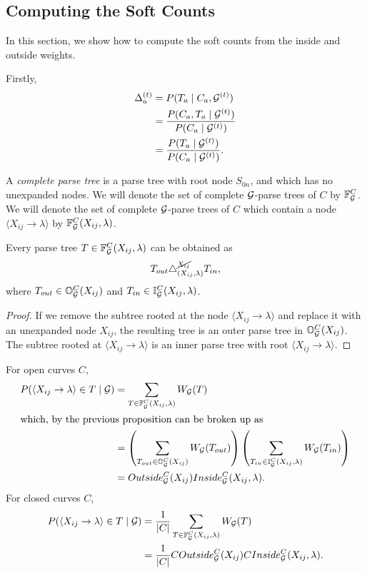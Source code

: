 \documentclass{article}
\newcommand\Inner{\mathbb{I}}
\newcommand\Outer{\mathbb{O}}
\begin{document}
\subsection{Computing the Soft Counts}
In this section, we show how to compute the soft counts from the inside and outside weights.

Firstly,
\begin{align*}
\Delta_a^{(t)} &= P(T_a \mid C_a, {\mathcal G}^{(t)})\\
 &= \frac{P(C_a, T_a \mid {\mathcal G}^{(t)})}{P(C_a \mid {\mathcal G}^{(t)})}\\
&= \frac{P(T_a \mid {\mathcal G}^{(t)})}{P(C_a \mid {\mathcal G}^{(t)})}.\\
\end{align*}

\begin{defn}
A {\em complete parse tree} is a parse tree with root node $S_{0n}$,
and which has no unexpanded nodes. We will denote the set of complete
${\mathcal G}$-parse trees of $C$ by $\mathbb{F}_{{\mathcal G}}^C$. We will denote the set of
complete ${\mathcal G}$-parse trees of $C$ which contain a node $\langle
X_{ij}\to \lambda \rangle$ by $\mathbb{F}_{{\mathcal G}}^C(X_{ij}, \lambda)$.
\end{defn}

\begin{prop}
Every parse tree $T \in \mathbb{F}_{{\mathcal G}}^C(X_{ij}, \lambda)$ can be obtained as
$$T_{out} \triangle^{\cancel{X_{ij}}}_{(X_{ij},\lambda)} T_{in},$$ 
where $T_{out}\in \Outer_\GGG^C(X_{ij})$ and $T_{in} \in
\Inner_\GGG^C(X_{ij}, \lambda)$.
\end{prop}
\begin{proof}
If we remove the subtree rooted at the node $\langle X_{ij} \to
\lambda \rangle$ and replace it with an unexpanded node $X_{ij}$, the
resulting tree is an outer parse tree in $\Outer_\GGG^C(X_{ij})$. The
subtree rooted at $\langle X_{ij} \to \lambda\rangle$ is an inner
parse tree with root $\langle X_{ij} \to \lambda \rangle$.
\end{proof}

\begin{obs}
For open curves $C$,
\begin{align*}
P(\langle X_{ij} \to \lambda \rangle \in T \mid \GGG) &=
\sum_{T \in \FF_\GGG^C(X_{ij}, \lambda)} W_\GGG(T)\\
\intertext{which, by the previous proposition can be broken up as}
&=
\left(\sum_{T_{out}\in \Outer_\GGG^C(X_{ij})}
  W_\GGG(T_{out}) \right)
\left(\sum_{T_{in}\in \Inner_\GGG^C(X_{ij},\lambda)} W_\GGG(T_{in})
\right)\\
&= Outside_\GGG^C(X_{ij}) Inside_\GGG^C(X_{ij}, \lambda).
\end{align*}
For closed curves $C$, 
\begin{align*}
P(\langle X_{ij} \to \lambda \rangle \in T \mid {\mathcal G}) &=
\frac{1}{|C|} \sum_{T \in \mathbb{F}_{{\mathcal G}}^C(X_{ij}, \lambda)} W_{{\mathcal G}}(T)\\
&= \frac{1}{|C|} COutside_{{\mathcal G}}^C(X_{ij}) CInside_{{\mathcal G}}^C(X_{ij}, \lambda).
\end{align*}

\end{obs}
\end{document}
